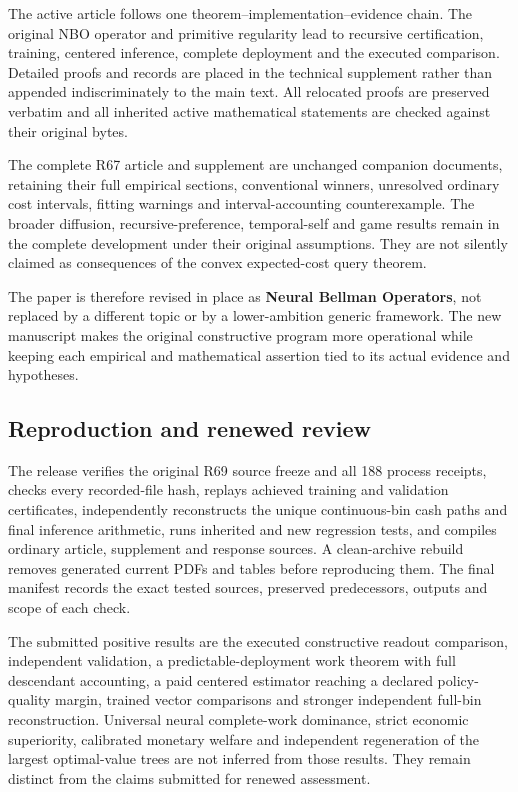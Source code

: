 The active article follows one theorem--implementation--evidence chain.
The original NBO operator and primitive regularity lead to recursive
certification, training, centered inference, complete deployment and the
executed comparison. Detailed proofs and records are placed in the
technical supplement rather than appended indiscriminately to the main
text. All relocated proofs are preserved verbatim and all inherited
active mathematical statements are checked against their original bytes.

The complete R67 article and supplement are unchanged companion
documents, retaining their full empirical sections, conventional
winners, unresolved ordinary cost intervals, fitting warnings and
interval-accounting counterexample. The broader diffusion,
recursive-preference, temporal-self and game results remain in the
complete development under their original assumptions. They are not
silently claimed as consequences of the convex expected-cost query
theorem.

The paper is therefore revised in place as \textbf{Neural Bellman
Operators}, not replaced by a different topic or by a lower-ambition
generic framework. The new manuscript makes the original constructive
program more operational while keeping each empirical and mathematical
assertion tied to its actual evidence and hypotheses.

\hypertarget{reproduction-and-renewed-review}{%
\subsection{Reproduction and renewed
review}\label{reproduction-and-renewed-review}}

The release verifies the original R69 source freeze and all 188 process
receipts, checks every recorded-file hash, replays achieved training and
validation certificates, independently reconstructs the unique
continuous-bin cash paths and final inference arithmetic, runs inherited
and new regression tests, and compiles ordinary article, supplement and
response sources. A clean-archive rebuild removes generated current PDFs
and tables before reproducing them. The final manifest records the exact
tested sources, preserved predecessors, outputs and scope of each check.

The submitted positive results are the executed constructive readout
comparison, independent validation, a predictable-deployment work
theorem with full descendant accounting, a paid centered estimator
reaching a declared policy-quality margin, trained vector comparisons
and stronger independent full-bin reconstruction. Universal neural
complete-work dominance, strict economic superiority, calibrated
monetary welfare and independent regeneration of the largest
optimal-value trees are not inferred from those results. They remain
distinct from the claims submitted for renewed assessment.
